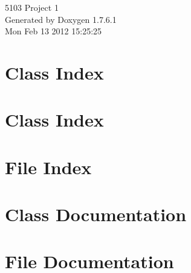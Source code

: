 \documentclass[a4paper]{book}
\begin{document}
\hypersetup{pageanchor=false,citecolor=blue}
\begin{titlepage}
\vspace*{7cm}
\begin{center}
{\Large 5103 \-Project 1 }\\
\vspace*{1cm}
{\large \-Generated by Doxygen 1.7.6.1}\\
\vspace*{0.5cm}
{\small Mon Feb 13 2012 15:25:25}\\
\end{center}
\end{titlepage}
\clearemptydoublepage
{}
\tableofcontents
\clearemptydoublepage
{}
\hypersetup{pageanchor=true,citecolor=blue}
\chapter{\-Class \-Index}

\chapter{\-Class \-Index}

\chapter{\-File \-Index}

\chapter{\-Class \-Documentation}













\chapter{\-File \-Documentation}






\printindex
\end{document}
